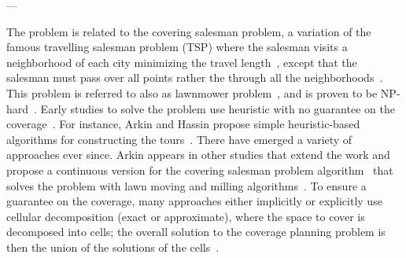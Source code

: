 ---

The problem is related to the covering salesman problem, a variation of the famous travelling salesman problem (TSP) where the salesman visits a neighborhood of each city minimizing the travel length~\citep{arkin1994approximation}, except that the salesman must pass over all points rather the through all the neighborhoods~\citep{choset2001coverage}. This problem is referred to also as lawnmower problem~\citep{galceran2013survey}, and is proven to be NP-hard~\citep{arkin2000approximation}. Early studies to solve the problem use heuristic with no guarantee on the coverage~\citep{choset2001coverage}. For instance, Arkin and Hassin propose simple heuristic-based algorithms for constructing the tours~\citep{arkin1994approximation}. There have emerged a variety of approaches ever since. Arkin appears in other studies that extend the work and propose a continuous version for the covering salesman problem algorithm~\citep{arkin1993lawnmower,fekete1994lawnmower,arkin2000approximation} that solves the problem with lawn moving and milling algorithms~\citep{arkin2000approximation}. To ensure a guarantee on the coverage, many approaches either implicitly or explicitly use cellular decomposition (exact or approximate), where the space to cover is decomposed into cells; the overall solution to the coverage planning problem is then the union of the solutions of the cells~\citep{choset2001coverage}. 

